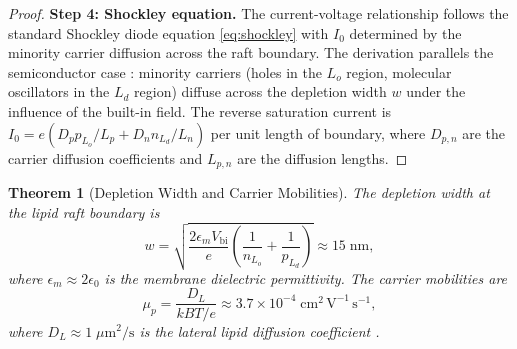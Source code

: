 \documentclass[twocolumn,10pt]{article}
\newtheorem{theorem}{Theorem}[section]
\theoremstyle{remark}
\begin{document}
\begin{proof}
\textbf{Step 4: Shockley equation.}
The current-voltage relationship follows the standard Shockley diode equation \eqref{eq:shockley} with $I_0$ determined by the minority carrier diffusion across the raft boundary. The derivation parallels the semiconductor case \cite{shockley1949}: minority carriers (holes in the $L_o$ region, molecular oscillators in the $L_d$ region) diffuse across the depletion width $w$ under the influence of the built-in field. The reverse saturation current is $I_0 = e(D_p p_{L_o}/L_p + D_n n_{L_d}/L_n)$ per unit length of boundary, where $D_{p,n}$ are the carrier diffusion coefficients and $L_{p,n}$ are the diffusion lengths.
\end{proof}

\begin{theorem}[Depletion Width and Carrier Mobilities]
\label{thm:depletion}
The depletion width at the lipid raft boundary is
\begin{equation}
w = \sqrt{\frac{2\epsilon_m V_{\mathrm{bi}}}{e}\!\left(\frac{1}{n_{L_o}} + \frac{1}{p_{L_d}}\right)} \approx 15\;\mathrm{nm},
\label{eq:depletion}
\end{equation}
where $\epsilon_m \approx 2\epsilon_0$ is the membrane dielectric permittivity. The carrier mobilities are
\begin{equation}
\mu_p = \frac{D_L}{kBT/e} \approx 3.7 \times 10^{-4}\;\mathrm{cm}^2\,\mathrm{V}^{-1}\,\mathrm{s}^{-1},
\label{eq:mobility}
\end{equation}
where $D_L \approx 1\;\mu\mathrm{m}^2/\mathrm{s}$ is the lateral lipid diffusion coefficient \cite{gennis1989}.
\end{theorem}
\end{document}
